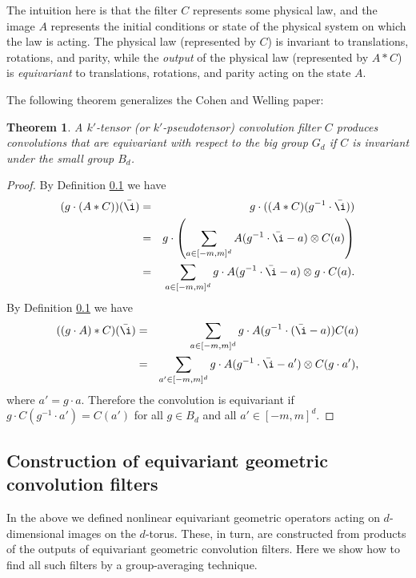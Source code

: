 \documentclass{article}
\theoremstyle{plain}
\newtheorem{theorem}{Theorem}
\begin{document}
The intuition here is that the filter $C$ represents some physical law, and the image $A$ represents the initial conditions or state of the physical system on which the law is acting.
The physical law (represented by $C$) is invariant to translations, rotations, and parity, while the \emph{output} of the physical law (represented by $A\ast C$) is \emph{equivariant} to translations, rotations, and parity acting on the state $A$.

The following theorem generalizes the Cohen and Welling paper:

\begin{theorem}
A $k'$-tensor (or $k'$-pseudotensor) convolution filter $C$ produces convolutions that are equivariant with respect to the big group $G_d$ if $C$ is invariant under the small group $B_d$.
\end{theorem}

\begin{proof}
By Definition \ref{} we have
\begin{eqnarray}
(g\cdot (A* C) )(\bar \i) &=& g\cdot( (A*C)(g^{-1} \cdot \bar \i)) \\
&=& g \cdot \left (\sum_{a\in [-m,m]^d} A(g^{-1}\cdot \bar \i - a) \otimes C(a)\right)\\
&=& \sum_{a\in [-m,m]^d} g \cdot A(g^{-1} \cdot \bar \i -a ) \otimes g \cdot C(a).
\end{eqnarray}
By Definition \ref{} we have
\begin{eqnarray}
((g\cdot A)* C) (\bar \i) &=& \sum_{a\in [-m,m]^d} g\cdot A(g^{-1} \cdot (\bar \i - a) ) C(a) \\
&=& \sum_{a'\in [-m,m]^d} g \cdot A(g^{-1}\cdot \bar \i -a') \otimes C(g\cdot a'),
\end{eqnarray}
where $a'=g\cdot a$. Therefore the convolution is equivariant if $g\cdot C(g^{-1} \cdot a') = C(a')$ for all $g\in B_d$ and all $a' \in [-m,m]^d$. 
\end{proof}

\subsection{Construction of equivariant geometric convolution filters}
In the above we defined nonlinear equivariant geometric operators acting on $d$-dimensional images on the $d$-torus.
These, in turn, are constructed from products of the outputs of equivariant geometric convolution filters.
Here we show how to find all such filters by a group-averaging technique.
\end{document}
